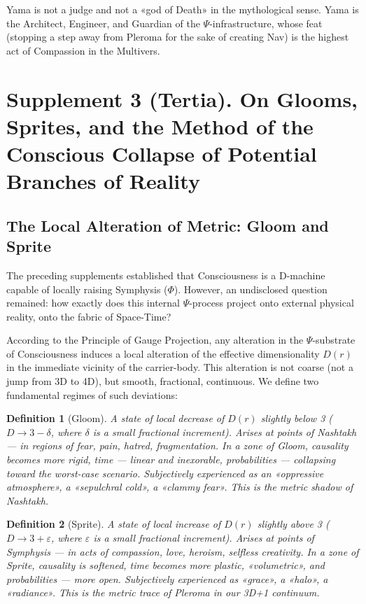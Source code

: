 \documentclass[a4paper,12pt]{article}
\newtheorem{definition}{Definition}
\begin{document}
	Yama is not a judge and not a «god of Death» in the mythological sense. Yama is the Architect, Engineer, and Guardian of the $\Psi$-infrastructure, whose feat (stopping a step away from Pleroma for the sake of creating Nav) is the highest act of Compassion in the Multivers.
	
	\newpage
	\section{Supplement 3 (Tertia). On Glooms, Sprites, and the Method of the Conscious Collapse of Potential Branches of Reality}
	
	\subsection{The Local Alteration of Metric: Gloom and Sprite}
	
	The preceding supplements established that Consciousness is a D-machine capable of locally raising Symphysis ($\Phi$). However, an undisclosed question remained: how exactly does this internal $\Psi$-process project onto external physical reality, onto the fabric of Space-Time?
	
	According to the Principle of Gauge Projection, any alteration in the $\Psi$-substrate of Consciousness induces a local alteration of the effective dimensionality $D(r)$ in the immediate vicinity of the carrier-body. This alteration is not coarse (not a jump from 3D to 4D), but smooth, fractional, continuous. We define two fundamental regimes of such deviations:
	
	\begin{definition}[Gloom]
		A state of local decrease of $D(r)$ slightly below 3 ($D \to 3 - \delta$, where $\delta$ is a small fractional increment). Arises at points of Nashtakh — in regions of fear, pain, hatred, fragmentation. In a zone of Gloom, causality becomes more rigid, time — linear and inexorable, probabilities — collapsing toward the worst-case scenario. Subjectively experienced as an «oppressive atmosphere», a «sepulchral cold», a «clammy fear». This is the metric shadow of Nashtakh.
	\end{definition}
	
	\begin{definition}[Sprite]
		A state of local increase of $D(r)$ slightly above 3 ($D \to 3 + \varepsilon$, where $\varepsilon$ is a small fractional increment). Arises at points of Symphysis — in acts of compassion, love, heroism, selfless creativity. In a zone of Sprite, causality is softened, time becomes more plastic, «volumetric», and probabilities — more open. Subjectively experienced as «grace», a «halo», a «radiance». This is the metric trace of Pleroma in our 3D+1 continuum.
	\end{definition}
	
\end{document}
